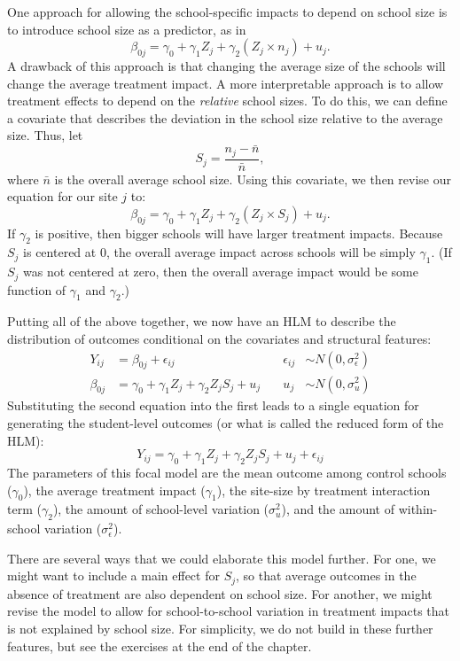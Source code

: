 \documentclass[
]{book}
\begin{document}
One approach for allowing the school-specific impacts to depend on school size is to introduce school size as a predictor, as in
\[
\beta_{0j} = \gamma_{0} + \gamma_{1} Z_j + \gamma_{2} \left(Z_j \times n_j\right) + u_j.
\]
A drawback of this approach is that changing the average size of the schools will change the average treatment impact.
A more interpretable approach is to allow treatment effects to depend on the \emph{relative} school sizes.
To do this, we can define a covariate that describes the deviation in the school size relative to the average size.
Thus, let
\[ S_j = \frac{n_j - \bar{n}}{ \bar{n} }, \]
where \(\bar{n}\) is the overall average school size.
Using this covariate, we then revise our equation for our site \(j\) to:
\[ \beta_{0j} = \gamma_{0} + \gamma_{1} Z_j + \gamma_{2} \left( Z_j \times S_j\right) + u_j. \]
If \(\gamma_{2}\) is positive, then bigger schools will have larger treatment impacts.
Because \(S_j\) is centered at 0, the overall average impact across schools will be simply \(\gamma_{1}\).
(If \(S_j\) was not centered at zero, then the overall average impact would be some function of \(\gamma_{1}\) and \(\gamma_{2}\).)

Putting all of the above together, we now have an HLM to describe the distribution of outcomes conditional on the covariates and structural features:
\[
\begin{aligned}
Y_{ij} &= \beta_{0j} + \epsilon_{ij} \quad &\epsilon_{ij} &\sim N( 0, \sigma^2_\epsilon ) \\
\beta_{0j} &= \gamma_{0} + \gamma_{1} Z_j + \gamma_{2} Z_j S_j + u_j \quad & u_j &\sim N( 0, \sigma^2_u )
\end{aligned}
\]
Substituting the second equation into the first leads to a single equation for generating the student-level outcomes (or what is called the reduced form of the HLM):
\[ Y_{ij} = \gamma_{0} + \gamma_{1} Z_j + \gamma_{2} Z_j S_j  + u_j + \epsilon_{ij}\]
The parameters of this focal model are the mean outcome among control schools (\(\gamma_{0}\)), the average treatment impact (\(\gamma_{1}\)), the site-size by treatment interaction term (\(\gamma_{2}\)), the amount of school-level variation (\(\sigma^2_u\)), and the amount of within-school variation (\(\sigma^2_\epsilon\)).

There are several ways that we could elaborate this model further.
For one, we might want to include a main effect for \(S_j\), so that average outcomes in the absence of treatment are also dependent on school size.
For another, we might revise the model to allow for school-to-school variation in treatment impacts that is not explained by school size.
For simplicity, we do not build in these further features, but see the exercises at the end of the chapter.
\end{document}
